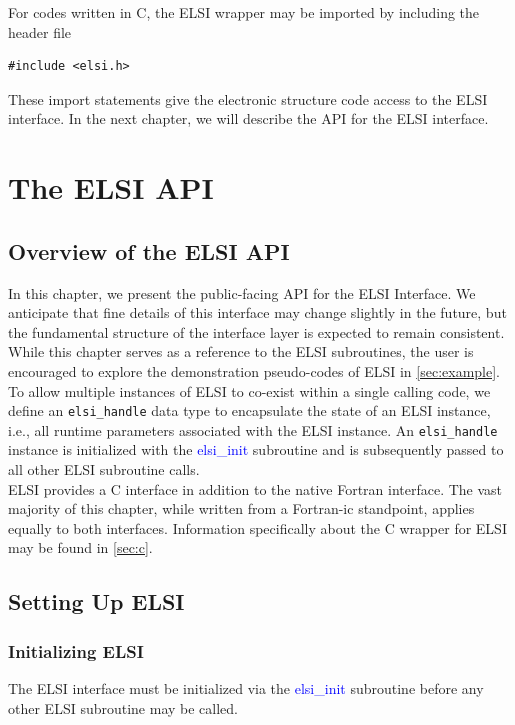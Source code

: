 \documentclass{report}
\begin{document}
For codes written in C, the ELSI wrapper may be imported by including the header file
\begin{verbatim}
#include <elsi.h>
\end{verbatim}

These import statements give the electronic structure code access to the ELSI interface.  In the next chapter, we will describe the API for the ELSI interface.

\chapter{The ELSI API}
\section{Overview of the ELSI API}
\label{sec:api}

In this chapter, we present the public-facing API for the ELSI Interface.  We anticipate that fine details of this interface may change slightly in the future, but the fundamental structure of the interface layer is expected to remain consistent.  While this chapter serves as a reference to the ELSI subroutines, the user is encouraged to explore the demonstration pseudo-codes of ELSI in \ref{sec:example}.\\

To allow multiple instances of ELSI to co-exist within a single calling code, we define an \texttt{elsi\_handle} data type to encapsulate the state of an ELSI instance, i.e., all runtime parameters associated with the ELSI instance.  An \texttt{elsi\_handle} instance is initialized with the \textcolor{blue}{elsi\_init} subroutine and is subsequently passed to all other ELSI subroutine calls.\\

ELSI provides a C interface in addition to the native Fortran interface.  The vast majority of this chapter, while written from a Fortran-ic standpoint, applies equally to both interfaces.  Information specifically about the C wrapper for ELSI may be found in \ref{sec:c}.\\

\section{Setting Up ELSI}
\label{sec:setup}
\subsection{Initializing ELSI}
\label{subsec:setup_init}
The ELSI interface must be initialized via the \textcolor{blue}{elsi\_init} subroutine before any other ELSI subroutine may be called.\\
\end{document}
